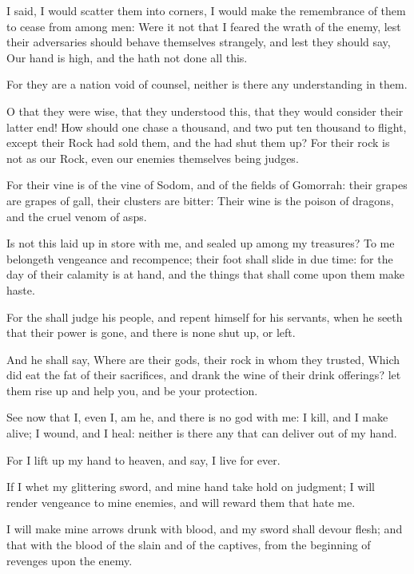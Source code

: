 \verse I said, I would scatter them into corners, I would make the remembrance of them to cease from among men: \verse Were it not that I feared the wrath of the enemy, lest their adversaries should behave themselves strangely, and lest they should say, Our hand is high, and the \LORD hath not done all this.

\verse For they are a nation void of counsel, neither is there any understanding in them.

\verse O that they were wise, that they understood this, that they would consider their latter end!  \verse How should one chase a thousand, and two put ten thousand to flight, except their Rock had sold them, and the \LORD had shut them up?  \verse For their rock is not as our Rock, even our enemies themselves being judges.

\verse For their vine is of the vine of Sodom, and of the fields of Gomorrah: their grapes are grapes of gall, their clusters are bitter: \verse Their wine is the poison of dragons, and the cruel venom of asps.

\verse Is not this laid up in store with me, and sealed up among my treasures?  \verse To me belongeth vengeance and recompence; their foot shall slide in due time: for the day of their calamity is at hand, and the things that shall come upon them make haste.

\verse For the \LORD shall judge his people, and repent himself for his servants, when he seeth that their power is gone, and there is none shut up, or left.

\verse And he shall say, Where are their gods, their rock in whom they trusted, \verse Which did eat the fat of their sacrifices, and drank the wine of their drink offerings? let them rise up and help you, and be your protection.

\verse See now that I, even I, am he, and there is no god with me: I kill, and I make alive; I wound, and I heal: neither is there any that can deliver out of my hand.

\verse For I lift up my hand to heaven, and say, I live for ever.

\verse If I whet my glittering sword, and mine hand take hold on judgment; I will render vengeance to mine enemies, and will reward them that hate me.

\verse I will make mine arrows drunk with blood, and my sword shall devour flesh; and that with the blood of the slain and of the captives, from the beginning of revenges upon the enemy.


